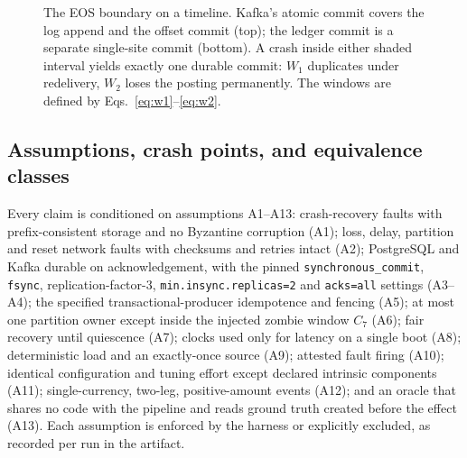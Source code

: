 \begin{figure}[t]
\centering
{}
\caption{The EOS boundary on a timeline. Kafka's atomic commit covers the log append and the
offset commit (top); the ledger commit is a separate single-site commit (bottom). A crash inside
either shaded interval yields exactly one durable commit: $W_1$ duplicates under redelivery,
$W_2$ loses the posting permanently. The windows are defined by
Eqs.~\eqref{eq:w1}--\eqref{eq:w2}.}
\label{fig:eos}
\end{figure}

\subsection{Assumptions, crash points, and equivalence classes}
\label{sec:model:assumptions}

Every claim is conditioned on assumptions A1--A13: crash-recovery faults with prefix-consistent
storage and no Byzantine corruption (A1); loss, delay, partition and reset network faults with
checksums and retries intact (A2); PostgreSQL and Kafka durable on acknowledgement, with the
pinned \texttt{synchronous\_commit}, \texttt{fsync}, replication-factor-3,
\texttt{min.insync.replicas=2} and \texttt{acks=all} settings (A3--A4); the specified
transactional-producer idempotence and fencing (A5); at most one partition owner except inside
the injected zombie window $C_7$ (A6); fair recovery until quiescence (A7); clocks used only for
latency on a single boot (A8); deterministic load and an exactly-once source (A9); attested fault
firing (A10); identical configuration and tuning effort except declared intrinsic components
(A11); single-currency, two-leg, positive-amount events (A12); and an oracle that shares no code
with the pipeline and reads ground truth created before the effect (A13). Each assumption is
enforced by the harness or explicitly excluded, as recorded per run in the artifact.

